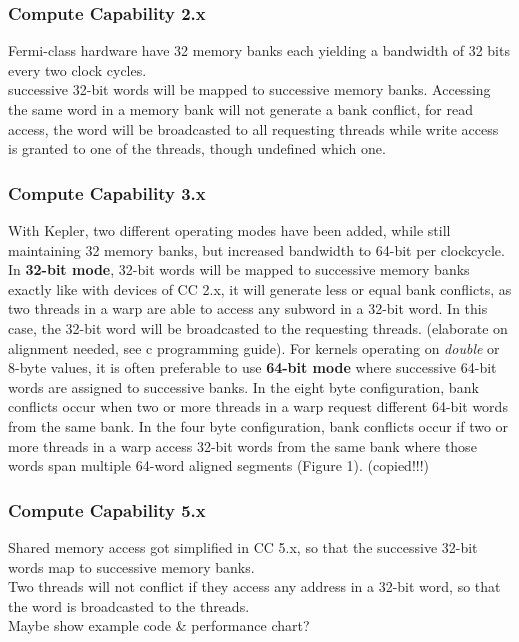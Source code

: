 \subsubsection{Compute Capability 2.x}
Fermi-class hardware have 32 memory banks each yielding a bandwidth of 32 bits every two clock cycles.\\
successive 32-bit words will be mapped to successive memory banks. Accessing the same word in a memory bank will not generate a bank conflict, for read access, the word will be broadcasted to all requesting threads while write access is granted to one of the threads, though undefined which one.\\ 
\subsubsection{Compute Capability 3.x}
With Kepler, two different operating modes have been added, while still maintaining 32 memory banks, but increased bandwidth to 64-bit per clockcycle.\\
In \textbf{32-bit mode}, 32-bit words will be mapped to successive memory banks exactly like with devices of CC 2.x, it will generate less or equal bank conflicts, as two threads in a warp are able to access any subword in a 32-bit word. In this case, the 32-bit word will be broadcasted to the requesting threads. (elaborate on alignment needed, see c programming guide).
For kernels operating on \emph{double} or 8-byte values, it is often preferable to use \textbf{64-bit mode} where successive 64-bit words are assigned to successive banks.
In the eight byte configuration, bank conflicts occur when two or more threads in a warp request different 64-bit words from the same bank. In the four byte configuration, bank conflicts occur if two or more threads in a warp access 32-bit words from the same bank where those words span multiple 64-word aligned segments (Figure 1). (copied!!!) \\
\subsubsection{Compute Capability 5.x}
Shared memory access got simplified in CC 5.x, so that the successive 32-bit words map to successive memory banks.\\
Two threads will not conflict if they access any address in a 32-bit word, so that the word is broadcasted to the threads.\\
Maybe show example code \& performance chart?
